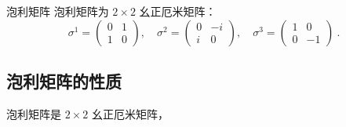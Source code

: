 \pentry{}

\begin{definition}{泡利矩阵}
泡利矩阵为 $2\times 2$ 幺正厄米矩阵：
\begin{equation}
\sigma^1 = \begin{pmatrix}
0 & 1\\
1 & 0
\end{pmatrix},\quad 
\sigma^2 = \begin{pmatrix}
0 & -i\\
i & 0
\end{pmatrix},\quad 
\sigma^3 = 
\begin{pmatrix}
1 & 0\\
0 & -1
\end{pmatrix}
~.
\end{equation}
\end{definition}

\subsection{泡利矩阵的性质}
泡利矩阵是 $2\times 2$ 幺正厄米矩阵，